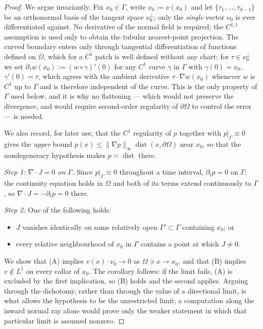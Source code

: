 \documentclass[11pt]{amsart}
\theoremstyle{definition}
\newcommand{\dive}{\nabla\!\cdot}
\begin{document}
\begin{proof}
We argue invariantly. Fix $x_0\in\Gamma$, write $\nu_0:=\nu(x_0)$ and
let $\{\tau_1,\dots,\tau_{d-1}\}$ be an orthonormal basis of the
tangent space $\nu_0^\perp$; only the \emph{single} vector $\nu_0$
is ever differentiated against.
No derivative of the normal field is required; the $C^{1,1}$
 assumption is used only to obtain the tubular nearest-point projection.
The curved boundary enters only through tangential differentiation
of functions defined on $\bar\Omega$, which for a $C^1$ patch is
well defined without any chart: for $\tau\in\nu_0^\perp$ we set
$\partial_\tau w(x_0):=(w\circ\gamma)'(0)$ for any $C^1$ curve
$\gamma$ in $\Gamma$ with $\gamma(0)=x_0$, $\gamma'(0)=\tau$, which
agrees with the ambient derivative $\tau\cdot\nabla w(x_0)$ whenever
$w$ is $C^1$ up to $\Gamma$ and is therefore independent of the
curve. This is the only property of $\Gamma$ used below, and it is
why no flattening --- which would not preserve the divergence, and
would require second-order regularity of $\partial\Omega$ to
control the error --- is needed.

We also record, for later use, that the $C^1$ regularity of $p$
together with $p|_\Gamma\equiv0$ gives the \emph{upper} bound
$p(x)\le\|\nabla p\|_\infty\operatorname{dist}(x,\partial\Omega)$
near $x_0$, so that the nondegeneracy hypothesis makes
$p\asymp\operatorname{dist}$ there.

\emph{Step 1: $\dive J=0$ on $\Gamma$.} Since $p|_\Gamma\equiv0$
throughout a time interval, $\partial_tp=0$ on $\Gamma$; the
continuity equation holds in $\Omega$ and both of its terms extend
continuously to $\Gamma$, so $\dive J=-\partial_tp=0$ there.

\emph{Step 2:} One of the following holds:
\begin{itemize}
\item[(A)] $J$ vanishes identically on some relatively open
$\Gamma'\subset\Gamma$ containing $x_0$; or
\item[(B)] every relative neighbourhood of $x_0$ in $\Gamma$
contains a point at which $J\neq0$.
\end{itemize}
We show that \textup{(A)} implies $v(x)\cdot\nu_0\to0$ as
$\Omega\ni x\to x_0$, and that \textup{(B)} implies $v\notin L^1$ on
every collar of $x_0$. The corollary follows: if the limit fails,
\textup{(A)} is excluded by the first implication, so \textup{(B)}
holds and the second applies. Arguing through the dichotomy, rather
than through the value of a directional limit, is what allows the
hypothesis to be the unrestricted limit; a computation along the
inward normal ray alone would prove only the weaker statement in
which that particular limit is assumed nonzero.


\end{proof}
\end{document}
